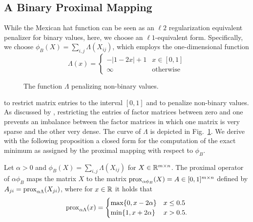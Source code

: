 \subsection{A Binary Proximal Mapping}\label{sec:PT:binprox}
While the Mexican hat function can be seen as an $\ell2$ regularization equivalent penalizer for binary values, here, we choose an $\ell1$-equivalent form.
Specifically, we choose $\phi_B(X)=\sum_{i,j}\Lambda(X_{ij})$, which employs the one-dimensional function 
\[
	\Lambda(x) = 
    \begin{cases}
        -|1-2x|+1 &x\in[0,1]\\
        \infty &\text{otherwise}
    \end{cases}
\]
\begin{figure}
\centering

\caption{The function $\Lambda$ penalizing non-binary values.}
\label{fig:lambda}
\end{figure}
to restrict matrix entries to the interval $[0,1]$ and to penalize non-binary values. As discussed by \cite{zhang2010binary}, restricting the entries of factor matrices between zero and one prevents an imbalance between the factor matrices in which one matrix is very sparse and the other very dense. The curve of $\Lambda$ is depicted  in Fig.~\ref{fig:lambda}. 
We derive with the following proposition a closed form for the computation of the exact minimum as assigned by the proximal mapping with respect to $\phi_B$. 
\begin{theorem}
Let $\alpha>0$ and $\phi_B(X)=\sum_{i,j}\Lambda(X_{ij})$ for $X\in\mathbb{R}^{m\times n}$. The proximal operator of $\alpha\phi_B$ maps the matrix $X$ to the matrix $\operatorname{prox}_{\alpha\phi_B}(X)=A\in [0,1]^{m\times n}$ defined by $A_{ji}=\operatorname{prox}_{\alpha\Lambda}(X_{ji})$, where for $x\in \mathbb{R}$ it holds that
    \begin{equation}\label{eq:binprox}
	\operatorname{prox}_{\alpha \Lambda}(x)=
    \begin{cases}
        \max\{0,x-2\alpha\} &x\leq0.5\\
        \min\{1,x+2\alpha\} &x>0.5.
    \end{cases}
    \end{equation}
\end{theorem}
